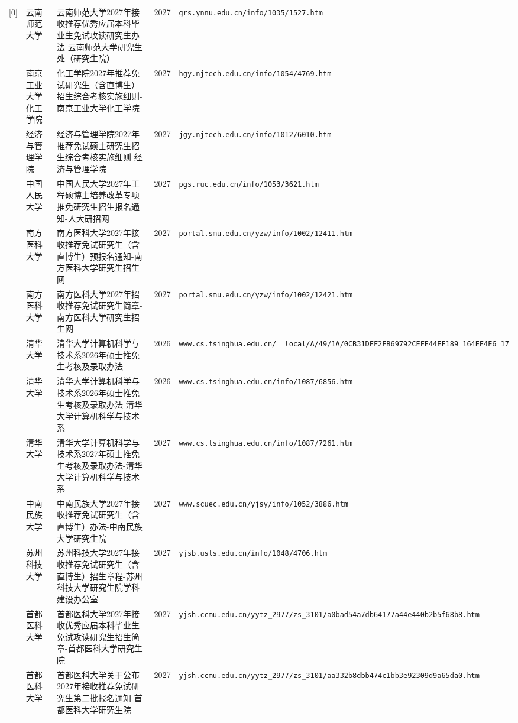 {\begin{longtable}{@{}p{1.15cm}p{2.9cm}p{6.3cm}p{0.85cm}p{5.0cm}@{}}
[0] & 云南师范大学 & 云南师范大学2027年接收推荐优秀应届本科毕业生免试攻读研究生办法-云南师范大学研究生处（研究生院） & 2027 & \texttt{grs.ynnu.edu.cn/info/1035/1527.htm} \\
[0] & 南京工业大学化工学院 & 化工学院2027年推荐免试研究生（含直博生）招生综合考核实施细则-南京工业大学化工学院 & 2027 & \texttt{hgy.njtech.edu.cn/info/1054/4769.htm} \\
[0] & 经济与管理学院 & 经济与管理学院2027年推荐免试硕士研究生招生综合考核实施细则-经济与管理学院 & 2027 & \texttt{jgy.njtech.edu.cn/info/1012/6010.htm} \\
[0] & 中国人民大学 & 中国人民大学2027年工程硕博士培养改革专项推免研究生招生报名通知-人大研招网 & 2027 & \texttt{pgs.ruc.edu.cn/info/1053/3621.htm} \\
[0] & 南方医科大学 & 南方医科大学2027年接收推荐免试研究生（含直博生）预报名通知-南方医科大学研究生招生网 & 2027 & \texttt{portal.smu.edu.cn/yzw/info/1002/12411.htm} \\
[0] & 南方医科大学 & 南方医科大学2027年招收推荐免试研究生简章-南方医科大学研究生招生网 & 2027 & \texttt{portal.smu.edu.cn/yzw/info/1002/12421.htm} \\
[0] & 清华大学 & 清华大学计算机科学与技术系2026年硕士推免生考核及录取办法 & 2026 & \texttt{www.cs.tsinghua.edu.cn/\_\_local/A/49/1A/0CB31DFF2FB69792CEFE44EF189\_164EF4E6\_17} \\
[0] & 清华大学 & 清华大学计算机科学与技术系2026年硕士推免生考核及录取办法-清华大学计算机科学与技术系 & 2026 & \texttt{www.cs.tsinghua.edu.cn/info/1087/6856.htm} \\
[0] & 清华大学 & 清华大学计算机科学与技术系2027年硕士推免生考核及录取办法-清华大学计算机科学与技术系 & 2027 & \texttt{www.cs.tsinghua.edu.cn/info/1087/7261.htm} \\
[0] & 中南民族大学 & 中南民族大学2027年接收推荐免试研究生（含直博生）办法-中南民族大学研究生院 & 2027 & \texttt{www.scuec.edu.cn/yjsy/info/1052/3886.htm} \\
[0] & 苏州科技大学 & 苏州科技大学2027年接收推荐免试研究生（含直博生）招生章程-苏州科技大学研究生院学科建设办公室 & 2027 & \texttt{yjsb.usts.edu.cn/info/1048/4706.htm} \\
[0] & 首都医科大学 & 首都医科大学2027年接收优秀应届本科毕业生免试攻读研究生招生简章-首都医科大学研究生院 & 2027 & \texttt{yjsh.ccmu.edu.cn/yytz\_2977/zs\_3101/a0bad54a7db64177a44e440b2b5f68b8.htm} \\
[0] & 首都医科大学 & 首都医科大学关于公布2027年接收推荐免试研究生第二批报名通知-首都医科大学研究生院 & 2027 & \texttt{yjsh.ccmu.edu.cn/yytz\_2977/zs\_3101/aa332b8dbb474c1bb3e92309d9a65da0.htm} \\

\end{longtable}}
